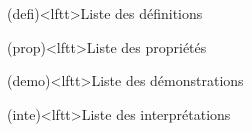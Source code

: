 \documentclass[../../main/main.tex]{subfiles}
\begin{document}
\vspace*{\fill}
\begin{boxes}
	\begin{tcb}(defi)<lftt>{Liste des définitions}
	\end{tcb}
	\begin{tcb}(prop)<lftt>{Liste des propriétés}
	\end{tcb}
	\begin{tcb}(demo)<lftt>{Liste des démonstrations}
	\end{tcb}
	\begin{tcb}(inte)<lftt>{Liste des interprétations}

\end{tcb}
\end{boxes}
\end{document}

